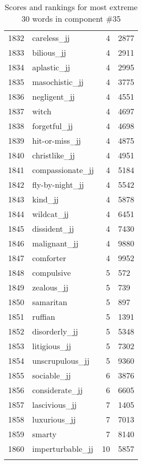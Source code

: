 \begin{longtable}[!htbp]{| rlr@{.}l |}
    1832 & careless\_jj & 4 & 2877 \\
    1833 & bilious\_jj & 4 & 2911 \\
    1834 & aplastic\_jj & 4 & 2995 \\
    1835 & masochistic\_jj & 4 & 3775 \\
    1836 & negligent\_jj & 4 & 4551 \\
    1837 & witch & 4 & 4697 \\
    1838 & forgetful\_jj & 4 & 4698 \\
    1839 & hit-or-miss\_jj & 4 & 4875 \\
    1840 & christlike\_jj & 4 & 4951 \\
    1841 & compassionate\_jj & 4 & 5184 \\
    1842 & fly-by-night\_jj & 4 & 5542 \\
    1843 & kind\_jj & 4 & 5878 \\
    1844 & wildcat\_jj & 4 & 6451 \\
    1845 & dissident\_jj & 4 & 7430 \\
    1846 & malignant\_jj & 4 & 9880 \\
    1847 & comforter & 4 & 9952 \\
    1848 & compulsive & 5 & 572 \\
    1849 & zealous\_jj & 5 & 739 \\
    1850 & samaritan & 5 & 897 \\
    1851 & ruffian & 5 & 1391 \\
    1852 & disorderly\_jj & 5 & 5348 \\
    1853 & litigious\_jj & 5 & 7302 \\
    1854 & unscrupulous\_jj & 5 & 9360 \\
    1855 & sociable\_jj & 6 & 3876 \\
    1856 & considerate\_jj & 6 & 6605 \\
    1857 & lascivious\_jj & 7 & 1405 \\
    1858 & luxurious\_jj & 7 & 7013 \\
    1859 & smarty & 7 & 8140 \\
    1860 & imperturbable\_jj & 10 & 5857 \\
    \hline
    \caption{Scores and rankings for most extreme 30 words in component \#35} \\
\end{longtable}
